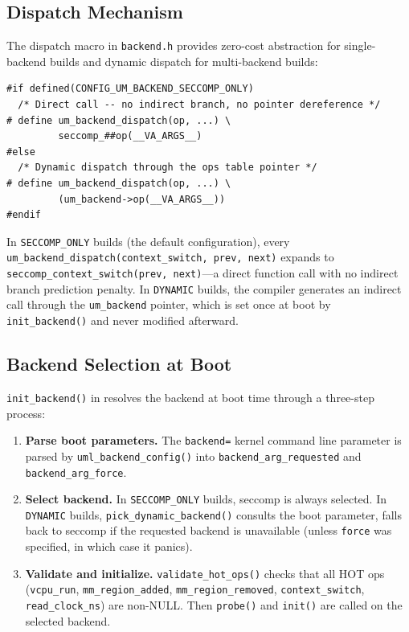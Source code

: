 \subsection{Dispatch Mechanism}

The dispatch macro in \texttt{backend.h} provides zero-cost abstraction for
single-backend builds and dynamic dispatch for multi-backend builds:

\begin{lstlisting}[language=KernelC,caption={Backend dispatch macro},label=lst:dispatch-macro-impl]
#if defined(CONFIG_UM_BACKEND_SECCOMP_ONLY)
  /* Direct call -- no indirect branch, no pointer dereference */
# define um_backend_dispatch(op, ...) \
         seccomp_##op(__VA_ARGS__)
#else
  /* Dynamic dispatch through the ops table pointer */
# define um_backend_dispatch(op, ...) \
         (um_backend->op(__VA_ARGS__))
#endif
\end{lstlisting}

In \texttt{SECCOMP\_ONLY} builds (the default configuration), every
\texttt{um\_backend\_dispatch(context\_switch, prev, next)} expands to
\texttt{seccomp\_context\_switch(prev, next)}---a direct function call with
no indirect branch prediction penalty.  In \texttt{DYNAMIC} builds, the
compiler generates an indirect call through the \texttt{um\_backend} pointer,
which is set once at boot by \texttt{init\_backend()} and never modified
afterward.

\subsection{Backend Selection at Boot}

\texttt{init\_backend()} in  resolves the
backend at boot time through a three-step process:

\begin{enumerate}[nosep]
\item \textbf{Parse boot parameters.}  The \texttt{backend=} kernel command
  line parameter is parsed by \texttt{uml\_backend\_config()} into
  \texttt{backend\_arg\_requested} and \texttt{backend\_arg\_force}.
\item \textbf{Select backend.}  In \texttt{SECCOMP\_ONLY} builds, seccomp is
  always selected.  In \texttt{DYNAMIC} builds, \texttt{pick\_dynamic\_backend()}
  consults the boot parameter, falls back to seccomp if the requested backend
  is unavailable (unless \texttt{force} was specified, in which case it panics).
\item \textbf{Validate and initialize.}  \texttt{validate\_hot\_ops()} checks
  that all HOT ops (\texttt{vcpu\_run}, \texttt{mm\_region\_added},
  \texttt{mm\_region\_removed}, \texttt{context\_switch},
  \texttt{read\_clock\_ns}) are non-NULL.  Then \texttt{probe()} and
  \texttt{init()} are called on the selected backend.
\end{enumerate}

